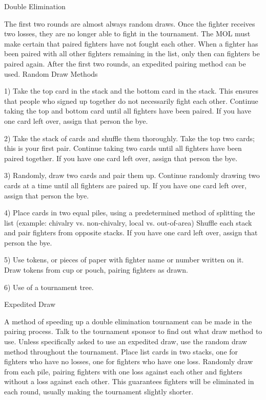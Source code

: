 \documentclass{article}
\begin{document}
Double Elimination

The first two rounds are almost always random draws. Once the fighter receives two losses, they are no
longer able to fight in the tournament. The MOL must make certain that paired fighters have not fought
each other. When a fighter has been paired with all other fighters remaining in the list, only then can
fighters be paired again. After the first two rounds, an expedited pairing method can be used.
Random Draw Methods

1) Take the top card in the stack and the bottom card in the stack. This ensures that people who signed up
together do not necessarily fight each other. Continue taking the top and bottom card until all fighters
have been paired. If you have one card left over, assign that person the bye.

2) Take the stack of cards and shuffle them thoroughly. Take the top two cards; this is your first pair.
Continue taking two cards until all fighters have been paired together. If you have one card left over,
assign that person the bye.

3) Randomly, draw two cards and pair them up. Continue randomly drawing two cards at a time until all
fighters are paired up. If you have one card left over, assign that person the bye.

4) Place cards in two equal piles, using a predetermined method of splitting the list (example: chivalry vs.
non-chivalry, local vs. out-of-area) Shuffle each stack and pair fighters from opposite stacks. If you
have one card left over, assign that person the bye.

5) Use tokens, or pieces of paper with fighter name or number written on it. Draw tokens from cup or
pouch, pairing fighters as drawn.

6) Use of a tournament tree.

Expedited Draw

A method of speeding up a double elimination tournament can be made in the pairing process. Talk to the
tournament sponsor to find out what draw method to use. Unless specifically asked to use an expedited
draw, use the random draw method throughout the tournament.
Place list cards in two stacks, one for fighters who have no losses, one for fighters who have one loss.
Randomly draw from each pile, pairing fighters with one loss against each other and fighters without a
loss against each other. This guarantees fighters will be eliminated in each round, usually making the
tournament slightly shorter.
\end{document}
